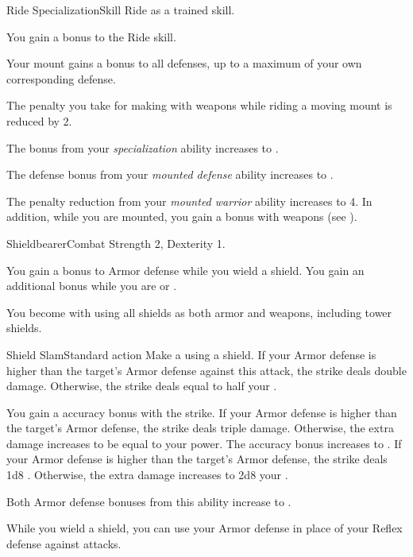   \begin{feat}{Ride Specialization}{Skill}
    \featpre Ride as a trained skill.

     You gain a  bonus to the Ride skill.

     Your mount gains a  bonus to all defenses, up to a maximum of your own corresponding defense.

     The penalty you take for making  with  weapons while riding a moving mount is reduced by 2.

     The bonus from your \textit{specialization} ability increases to .

     The defense bonus from your \textit{mounted defense} ability increases to .

     The penalty reduction from your \textit{mounted warrior} ability increases to 4.
    In addition, while you are mounted, you gain a   bonus with  weapons (see ).
  \end{feat}

  \begin{feat}{Shieldbearer}{Combat}
    \featpre Strength 2, Dexterity 1.

     You gain a  bonus to Armor defense while you wield a shield.
    You gain an additional  bonus while you are \braced or \shielded.

     You become  with using all shields as both armor and weapons, including tower shields.

    \begin{activeability}{Shield Slam}{Standard action}
        \rankline
        Make a  using a shield.
        If your Armor defense is higher than the target's Armor defense against this attack, the strike deals double damage.
        Otherwise, the strike deals  equal to half your .

        \rankline
         You gain a  accuracy bonus with the strike.
         If your Armor defense is higher than the target's Armor defense, the strike deals triple damage. Otherwise, the extra damage increases to be equal to your power.
         The accuracy bonus increases to .
         If your Armor defense is higher than the target's Armor defense, the strike deals 1d8 . Otherwise, the extra damage increases to 2d8 \add your .
    \end{activeability}

     Both Armor defense bonuses from this ability increase to .

     While you wield a shield, you can use your Armor defense in place of your Reflex defense against  attacks.
  \end{feat}

